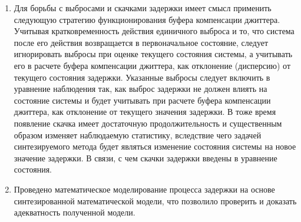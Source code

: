 \begin{enumerate}

\item Для борьбы с выбросами и скачками задержки имеет смысл применить следующую стратегию функционирования буфера компенсации джиттера.
Учитывая кратковременность действия единичного выброса и то, что система после его действия возвращается в первоначальное состояние, следует игнорировать выбросы при оценке текущего состояния системы,
а учитывать его в расчете буфера компенсации джиттера, как отклонение (дисперсию) от текущего состояния задержки.
Указанные выбросы следует включить в уравнение наблюдения так, как выброс задержки не должен влиять на состояние системы 
и будет учитывать при расчете буфера компенсации джиттера, как отклонение от текущего значения задержки.
В тоже время появление скачка имеет достаточную продолжительность и существенным образом изменяет наблюдаемую статистику, вследствие чего задачей синтезируемого метода будет являться изменение состояния системы на новое значение задержки.
В связи, с чем скачки задержки введены в уравнение состояния.

\item Проведено математическое моделирование процесса задержки на основе синтезированной математической модели, что позволило проверить и доказать адекватность полученной модели.
\end{enumerate}

